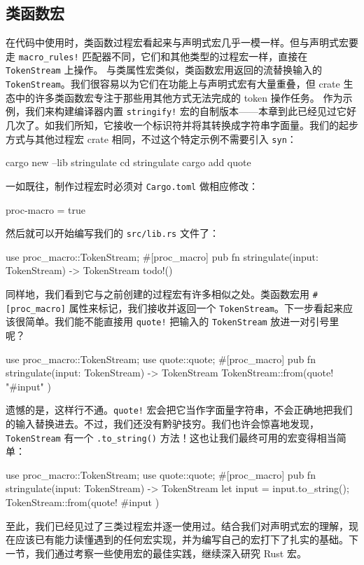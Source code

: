 \subsection{类函数宏}
\label{idx:idx_36c0ec73}
在代码中使用时，类函数过程宏看起来与声明式宏几乎一模一样。但与声明式宏要走 \texttt{macro\_\allowbreak{}rules!} 匹配器不同，它们和其他类型的过程宏一样，直接在 \texttt{TokenStream} 上操作。
\label{idx:idx_305c2216}
与类属性宏类似，类函数宏用返回的流替换输入的 \texttt{TokenStream}。我们很容易以为它们在功能上与声明式宏有大量重叠，但 crate 生态中的许多类函数宏专注于那些用其他方式无法完成的 token 操作任务。
作为示例，我们来构建编译器内置 \texttt{stringify!} 宏的自制版本——本章到此已经见过它好几次了。如我们所知，它接收一个标识符并将其转换成字符串字面量。我们的起步方式与其他过程宏 crate 相同，不过这个特定示例不需要引入 \texttt{syn}：
\begin{codeboxdark}
cargo new --lib stringulate
cd stringulate
cargo add quote
\end{codeboxdark}
一如既往，制作过程宏时必须对 \texttt{Cargo.toml} 做相应修改：
\begin{codeboxdark}
[lib]
proc-macro = true
\end{codeboxdark}
然后就可以开始编写我们的 \texttt{src/lib.rs} 文件了：
\begin{codebox}[rust]
use proc_macro::TokenStream;
#[proc_macro]
pub fn stringulate(input: TokenStream) -> TokenStream {
    todo!()
}
\end{codebox}
\label{idx:idx_7baaf2ab}
\label{idx:idx_29ed56bf}
同样地，我们看到它与之前创建的过程宏有许多相似之处。类函数宏用 \texttt{\#[\allowbreak{}proc\_\allowbreak{}macro]\allowbreak{}} 属性来标记，我们接收并返回一个
\texttt{TokenStream}。下一步看起来应该很简单。我们能不能直接用 \texttt{quote!}
把输入的 \texttt{TokenStream} 放进一对引号里呢？
\begin{codebox}[rust]
use proc_macro::TokenStream;
use quote::quote;
#[proc_macro]
pub fn stringulate(input: TokenStream) -> TokenStream {
    TokenStream::from(quote! {
        "#input"
    })
}
\end{codebox}
遗憾的是，这样行不通。\texttt{quote!} 宏会把它当作字面量字符串，不会正确地把我们的输入替换进去。不过，我们还没有黔驴技穷。我们也许会惊喜地发现，\texttt{TokenStream} 有一个 \texttt{.\allowbreak{}to\_\allowbreak{}string(\allowbreak{})\allowbreak{}} 方法！这也让我们最终可用的宏变得相当简单：
\begin{codebox}[rust]
use proc_macro::TokenStream;
use quote::quote;
#[proc_macro]
pub fn stringulate(input: TokenStream) -> TokenStream {
    let input = input.to_string();
    TokenStream::from(quote! {
        #input
    })
}
\end{codebox}
\label{idx:idx_fa46ac05}
\label{idx:idx_60b4719f}
至此，我们已经见过了三类过程宏并逐一使用过。结合我们对声明式宏的理解，现在应该已有能力读懂遇到的任何宏实现，并为编写自己的宏打下了扎实的基础。下一节，我们通过考察一些使用宏的最佳实践，继续深入研究 Rust 宏。
